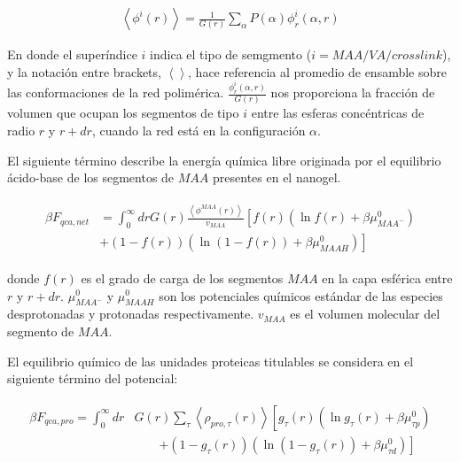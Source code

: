 \begin{align}
	\left< \phi^i(r)\right> = \frac{1}{G(r)} \sum_\alpha{P(\alpha)\phi^i_r(\alpha,r)} 
	\label{eq:esf:ensamble-gel}
 \end{align}

En donde el super\'indice $i$ indica el tipo de semgmento ($i = MAA/VA/crosslink$), y la notaci\'on entre brackets, $\left<\right>$,   hace referencia al promedio de ensamble sobre las conformaciones de la red polim\'erica. 
$\frac{\phi^i_r(\alpha,r)}{G(r)}$  nos proporciona la fracci\'on de volumen que ocupan los segmentos de tipo $i$ entre las esferas conc\'entricas de radio $r$ y $r + dr$, cuando la red est\'a en la configuraci\'on $\alpha$.




El siguiente t\'ermino describe la energ\'ia qu\'imica libre originada por el equilibrio \'acido-base de los segmentos de $MAA$ presentes en el nanogel.

\begin{align}
	\begin{aligned}
		\beta F_{qca,net} &= \int_0^\infty drG(r) \frac{\left<\phi^{MAA}(r)\right>}{v_{MAA}} \left[f(r)(\ln f(r)+ \beta\mu^0_{MAA^-})\right.\\
		&\left.+(1-f(r))(\ln (1-f(r))+\beta\mu^0_{MAAH})\right]    
	\end{aligned}
\end{align} 


\noindent donde $f(r)$ es el grado de carga de los segmentos $MAA$ en la capa esf\'erica entre $r$ y $r + dr$.
$\mu^0_{MAA^-}$ y $\mu^0_{MAAH}$ son los potenciales qu\'imicos est\'andar de las especies desprotonadas y protonadas respectivamente. $v_{MAA}$ es el volumen molecular del segmento de $MAA$.



El equilibrio qu\'imico de las unidades proteicas titulables se considera en el siguiente t\'ermino del potencial:

\begin{align}
	\begin{aligned}
		\beta F_{qca,pro} =\int_0^\infty dr &G(r) \sum_\tau \left<\rho_{pro,\tau}(r)\right> \left[g_\tau(r)(\ln g_\tau(r)+ \beta\mu^0_{\tau p})\right.\\
		&\qquad\left.+(1-g_\tau(r))(\ln (1-g_\tau(r))+\beta\mu^0_{\tau d})\right]
		\label{eq:esf:fca-pro}   
	\end{aligned}
\end{align} 

